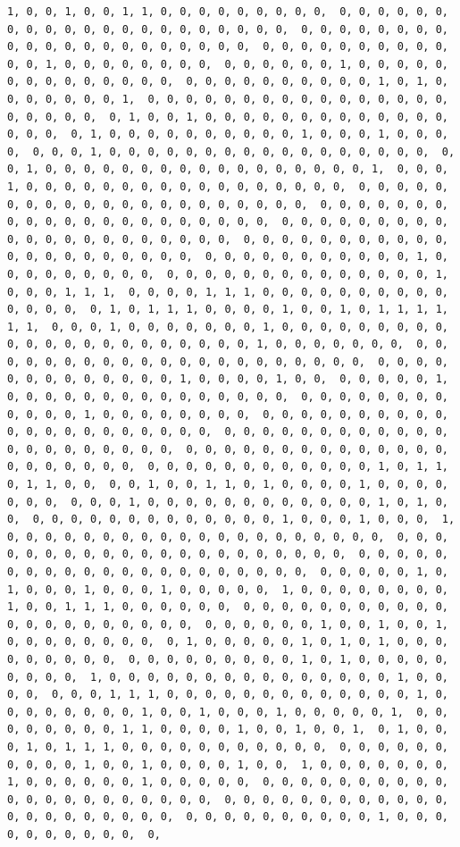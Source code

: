 \documentclass[
]{article}
\begin{document}
\begin{verbatim}
1, 0, 0, 1, 0, 0, 1, 1, 0, 0, 0, 0, 0, 0, 0, 0, 0,  0, 0, 0, 0, 0, 0, 0, 0, 0, 0, 0, 0, 0, 0, 0, 0, 0, 0, 0, 0, 0,  0, 0, 0, 0, 0, 0, 0, 0, 0, 0, 0, 0, 0, 0, 0, 0, 0, 0, 0, 0, 0,  0, 0, 0, 0, 0, 0, 0, 0, 0, 0, 0, 0, 1, 0, 0, 0, 0, 0, 0, 0, 0,  0, 0, 0, 0, 0, 0, 1, 0, 0, 0, 0, 0, 0, 0, 0, 0, 0, 0, 0, 0, 0,  0, 0, 0, 0, 0, 0, 0, 0, 0, 0, 1, 0, 1, 0, 0, 0, 0, 0, 0, 0, 1,  0, 0, 0, 0, 0, 0, 0, 0, 0, 0, 0, 0, 0, 0, 0, 0, 0, 0, 0, 0, 0,  0, 1, 0, 0, 1, 0, 0, 0, 0, 0, 0, 0, 0, 0, 0, 0, 0, 0, 0, 0, 0,  0, 1, 0, 0, 0, 0, 0, 0, 0, 0, 0, 0, 1, 0, 0, 0, 1, 0, 0, 0, 0,  0, 0, 0, 1, 0, 0, 0, 0, 0, 0, 0, 0, 0, 0, 0, 0, 0, 0, 0, 0, 0,  0, 0, 1, 0, 0, 0, 0, 0, 0, 0, 0, 0, 0, 0, 0, 0, 0, 0, 0, 0, 1,  0, 0, 0, 1, 0, 0, 0, 0, 0, 0, 0, 0, 0, 0, 0, 0, 0, 0, 0, 0, 0,  0, 0, 0, 0, 0, 0, 0, 0, 0, 0, 0, 0, 0, 0, 0, 0, 0, 0, 0, 0, 0,  0, 0, 0, 0, 0, 0, 0, 0, 0, 0, 0, 0, 0, 0, 0, 0, 0, 0, 0, 0, 0,  0, 0, 0, 0, 0, 0, 0, 0, 0, 0, 0, 0, 0, 0, 0, 0, 0, 0, 0, 0, 0,  0, 0, 0, 0, 0, 0, 0, 0, 0, 0, 0, 0, 0, 0, 0, 0, 0, 0, 0, 0, 0,  0, 0, 0, 0, 0, 0, 0, 0, 0, 0, 0, 1, 0, 0, 0, 0, 0, 0, 0, 0, 0,  0, 0, 0, 0, 0, 0, 0, 0, 0, 0, 0, 0, 0, 0, 1, 0, 0, 0, 1, 1, 1,  0, 0, 0, 0, 1, 1, 1, 0, 0, 0, 0, 0, 0, 0, 0, 0, 0, 0, 0, 0, 0,  0, 1, 0, 1, 1, 1, 0, 0, 0, 0, 1, 0, 0, 1, 0, 1, 1, 1, 1, 1, 1,  0, 0, 0, 1, 0, 0, 0, 0, 0, 0, 0, 1, 0, 0, 0, 0, 0, 0, 0, 0, 0,  0, 0, 0, 0, 0, 0, 0, 0, 0, 0, 0, 0, 0, 1, 0, 0, 0, 0, 0, 0, 0,  0, 0, 0, 0, 0, 0, 0, 0, 0, 0, 0, 0, 0, 0, 0, 0, 0, 0, 0, 0, 0,  0, 0, 0, 0, 0, 0, 0, 0, 0, 0, 0, 0, 0, 1, 0, 0, 0, 0, 1, 0, 0,  0, 0, 0, 0, 0, 1, 0, 0, 0, 0, 0, 0, 0, 0, 0, 0, 0, 0, 0, 0, 0,  0, 0, 0, 0, 0, 0, 0, 0, 0, 0, 0, 0, 1, 0, 0, 0, 0, 0, 0, 0, 0,  0, 0, 0, 0, 0, 0, 0, 0, 0, 0, 0, 0, 0, 0, 0, 0, 0, 0, 0, 0, 0,  0, 0, 0, 0, 0, 0, 0, 0, 0, 0, 0, 0, 0, 0, 0, 0, 0, 0, 0, 0, 0,  0, 0, 0, 0, 0, 0, 0, 0, 0, 0, 0, 0, 0, 0, 0, 0, 0, 0, 0, 0, 0,  0, 0, 0, 0, 0, 0, 0, 0, 0, 0, 0, 0, 1, 0, 1, 1, 0, 1, 1, 0, 0,  0, 0, 1, 0, 0, 1, 1, 0, 1, 0, 0, 0, 0, 1, 0, 0, 0, 0, 0, 0, 0,  0, 0, 0, 1, 0, 0, 0, 0, 0, 0, 0, 0, 0, 0, 0, 0, 1, 0, 1, 0, 0,  0, 0, 0, 0, 0, 0, 0, 0, 0, 0, 0, 0, 0, 1, 0, 0, 0, 1, 0, 0, 0,  1, 0, 0, 0, 0, 0, 0, 0, 0, 0, 0, 0, 0, 0, 0, 0, 0, 0, 0, 0, 0,  0, 0, 0, 0, 0, 0, 0, 0, 0, 0, 0, 0, 0, 0, 0, 0, 0, 0, 0, 0, 0,  0, 0, 0, 0, 0, 0, 0, 0, 0, 0, 0, 0, 0, 0, 0, 0, 0, 0, 0, 0, 0,  0, 0, 0, 0, 0, 1, 0, 1, 0, 0, 0, 1, 0, 0, 0, 1, 0, 0, 0, 0, 0,  1, 0, 0, 0, 0, 0, 0, 0, 0, 1, 0, 0, 1, 1, 1, 0, 0, 0, 0, 0, 0,  0, 0, 0, 0, 0, 0, 0, 0, 0, 0, 0, 0, 0, 0, 0, 0, 0, 0, 0, 0, 0,  0, 0, 0, 0, 0, 0, 1, 0, 0, 1, 0, 0, 1, 0, 0, 0, 0, 0, 0, 0, 0,  0, 1, 0, 0, 0, 0, 0, 1, 0, 1, 0, 1, 0, 0, 0, 0, 0, 0, 0, 0, 0,  0, 0, 0, 0, 0, 0, 0, 0, 0, 1, 0, 1, 0, 0, 0, 0, 0, 0, 0, 0, 0,  1, 0, 0, 0, 0, 0, 0, 0, 0, 0, 0, 0, 0, 0, 0, 0, 1, 0, 0, 0, 0,  0, 0, 0, 1, 1, 1, 0, 0, 0, 0, 0, 0, 0, 0, 0, 0, 0, 0, 0, 1, 0,  0, 0, 0, 0, 0, 0, 0, 1, 0, 0, 1, 0, 0, 0, 1, 0, 0, 0, 0, 0, 1,  0, 0, 0, 0, 0, 0, 0, 0, 1, 1, 0, 0, 0, 0, 1, 0, 0, 1, 0, 0, 1,  0, 1, 0, 0, 0, 1, 0, 1, 1, 1, 0, 0, 0, 0, 0, 0, 0, 0, 0, 0, 0,  0, 0, 0, 0, 0, 0, 0, 0, 0, 0, 1, 0, 0, 1, 0, 0, 0, 0, 1, 0, 0,  1, 0, 0, 0, 0, 0, 0, 0, 1, 0, 0, 0, 0, 0, 0, 1, 0, 0, 0, 0, 0,  0, 0, 0, 0, 0, 0, 0, 0, 0, 0, 0, 0, 0, 0, 0, 0, 0, 0, 0, 0, 0,  0, 0, 0, 0, 0, 0, 0, 0, 0, 0, 0, 0, 0, 0, 0, 0, 0, 0, 0, 0, 0,  0, 0, 0, 0, 0, 0, 0, 0, 0, 0, 1, 0, 0, 0, 0, 0, 0, 0, 0, 0, 0,  0, 
\end{verbatim}
\end{document}
